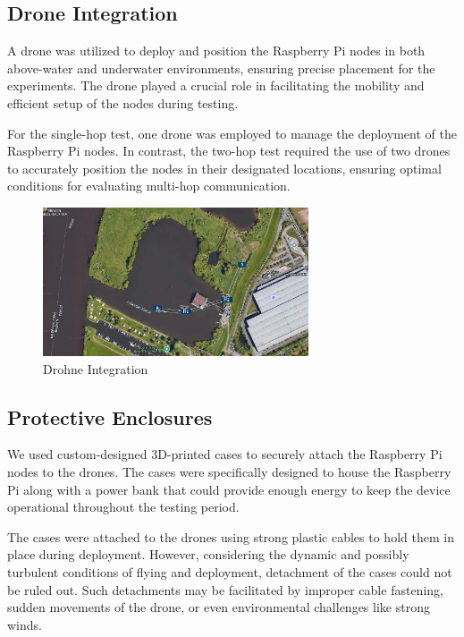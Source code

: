 \documentclass[]{nsm-thesis}
\begin{document}
\subsection{Drone Integration}
A drone was utilized to deploy and position the Raspberry Pi nodes in both above-water and underwater environments, ensuring precise placement for the experiments. The drone played a crucial role in facilitating the mobility and efficient setup of the nodes during testing.

For the single-hop test, one drone was employed to manage the deployment of the Raspberry Pi nodes. In contrast, the two-hop test required the use of two drones to accurately position the nodes in their designated locations, ensuring optimal conditions for evaluating multi-hop communication.
\begin{figure}[h!]
    \centering
    \includegraphics[width=0.7\textwidth]{image/2_Drohne_integration.png}
    \caption{Drohne Integration}
    \label{fig:example6}
\end{figure}

\subsection{Protective Enclosures}
We used custom-designed 3D-printed cases to securely attach the Raspberry Pi nodes to the drones. The cases were specifically designed to house the Raspberry Pi along with a power bank that could provide enough energy to keep the device operational throughout the testing period.

The cases were attached to the drones using strong plastic cables to hold them in place during deployment. However, considering the dynamic and possibly turbulent conditions of flying and deployment, detachment of the cases could not be ruled out. Such detachments may be facilitated by improper cable fastening, sudden movements of the drone, or even environmental challenges like strong winds.
\end{document}

